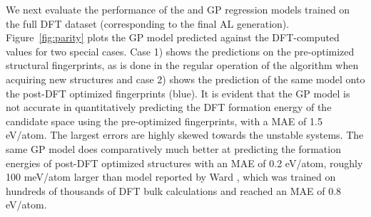 


We next evaluate the performance of the \IrOtwo and \IrOthree GP regression models trained on the full DFT dataset (corresponding to the final AL generation).
%
Figure~\ref{fig:parity} plots the GP model predicted \DHf against the DFT-computed values for two special cases.
%
Case 1) shows the predictions on the pre-optimized structural fingerprints, as is done in the regular operation of the algorithm when acquiring new structures and
case 2) shows the prediction of the same model onto the post-DFT optimized fingerprints (blue).
%
It is evident that the GP model is not accurate in quantitatively predicting the DFT formation energy of the candidate space using the pre-optimized fingerprints,
with a MAE of \mytilde\num{1.5} eV/atom.
%
The largest errors are highly skewed towards the unstable systems.
%
The same GP model does comparatively much better at predicting the formation energies of post-DFT optimized structures with an MAE of \mytilde\num{0.2} eV/atom,
roughly 100 meV/atom larger than model reported by Ward , which was trained on hundreds of thousands of DFT bulk calculations and reached an MAE of 0.8 eV/atom.
%


